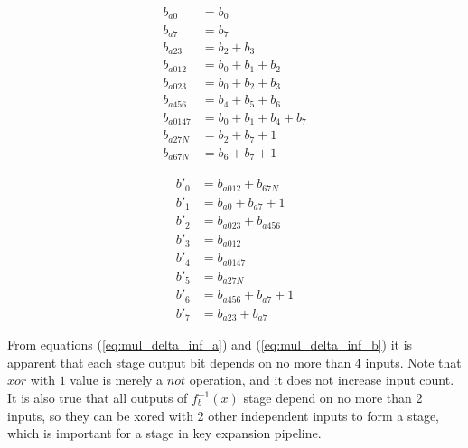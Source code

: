 \begin{figure}[!h]
\begin{multicols}{2}

\begin{equation}
\label{eq:mul_delta_inf_a}
\begin{aligned}
b_{a0}    &= b_0                    \\
b_{a7}    &= b_7                    \\
b_{a23}   &= b_2 + b_3              \\
b_{a012}  &= b_0 + b_1 + b_2        \\
b_{a023}  &= b_0 + b_2 + b_3        \\
b_{a456}  &= b_4 + b_5 + b_6        \\
b_{a0147} &= b_0 + b_1 + b_4 + b_7  \\
b_{a27N}  &= b_2 + b_7 + 1          \\
b_{a67N}  &= b_6 + b_7 + 1            
\end{aligned}
\end{equation}

\begin{equation}
\label{eq:mul_delta_inf_b}
\begin{aligned}
b'_0 &= b_{a012} + b_{67N}           \\
b'_1 &= b_{a0} + b_{a7} + 1          \\
b'_2 &= b_{a023} + b_{a456}          \\
b'_3 &= b_{a012}                     \\
b'_4 &= b_{a0147}                    \\
b'_5 &= b_{a27N}                     \\
b'_6 &= b_{a456} + b_{a7} + 1        \\
b'_7 &= b_{a23} + b_{a7}                    
\end{aligned}
\end{equation}

\end{multicols}
\end{figure}

From equations (\ref{eq:mul_delta_inf_a}) and (\ref{eq:mul_delta_inf_b}) it is apparent that each stage output bit depends on no more than 4 inputs. Note that $xor$ with $1$ value is merely a $not$ operation, and it does not increase input count. It is also true that all outputs of $f_b^{-1}(x)$ stage depend on no more than 2 inputs, so they can be xored with 2 other independent inputs to form a stage, which is important for a stage in key expansion pipeline.




